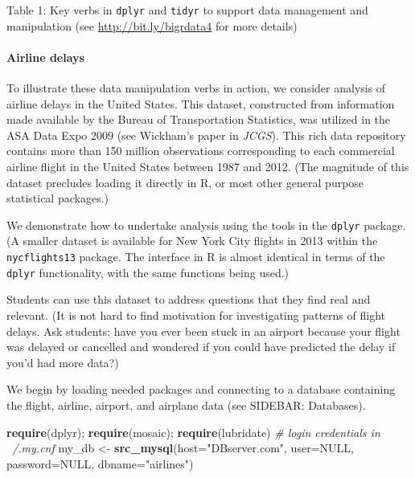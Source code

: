 \documentclass[]{article}
\newenvironment{Shaded}{\begin{snugshade}}{\end{snugshade}}
\newcommand{\KeywordTok}[1]{\textcolor[rgb]{0.13,0.29,0.53}{\textbf{{#1}}}}
\newcommand{\DataTypeTok}[1]{\textcolor[rgb]{0.13,0.29,0.53}{{#1}}}
\newcommand{\StringTok}[1]{\textcolor[rgb]{0.31,0.60,0.02}{{#1}}}
\newcommand{\CommentTok}[1]{\textcolor[rgb]{0.56,0.35,0.01}{\textit{{#1}}}}
\newcommand{\OtherTok}[1]{\textcolor[rgb]{0.56,0.35,0.01}{{#1}}}
\newcommand{\NormalTok}[1]{{#1}}
\begin{document}
Table 1: Key verbs in \texttt{dplyr} and \texttt{tidyr} to support data
management and manipulation (see \url{http://bit.ly/bigrdata4} for more
details)

\paragraph{Airline delays}\label{airline-delays}

To illustrate these data manipulation verbs in action, we consider
analysis of airline delays in the United States. This dataset,
constructed from information made available by the Bureau of
Transportation Statistics, was utilized in the ASA Data Expo 2009 (see
Wickham's paper in \emph{JCGS}). This rich data repository contains more
than 150 million observations corresponding to each commercial airline
flight in the United States between 1987 and 2012. (The magnitude of
this dataset precludes loading it directly in R, or most other general
purpose statistical packages.)

We demonstrate how to undertake analysis using the tools in the
\texttt{dplyr} package. (A smaller dataset is available for New York
City flights in 2013 within the \texttt{nycflights13} package. The
interface in R is almost identical in terms of the \texttt{dplyr}
functionality, with the same functions being used.)

Students can use this dataset to address questions that they find real
and relevant. (It is not hard to find motivation for investigating
patterns of flight delays. Ask students: have you ever been stuck in an
airport because your flight was delayed or cancelled and wondered if you
could have predicted the delay if you'd had more data?)

We begin by loading needed packages and connecting to a database
containing the flight, airline, airport, and airplane data (see SIDEBAR:
Databases).

\begin{Shaded}
\begin{Highlighting}[]
\KeywordTok{require}\NormalTok{(dplyr); }\KeywordTok{require}\NormalTok{(mosaic); }\KeywordTok{require}\NormalTok{(lubridate)    }\CommentTok{# login credentials in ~/.my.cnf}
\NormalTok{my_db <-}\StringTok{ }\KeywordTok{src_mysql}\NormalTok{(}\DataTypeTok{host=}\StringTok{"DBserver.com"}\NormalTok{, }\DataTypeTok{user=}\OtherTok{NULL}\NormalTok{, }\DataTypeTok{password=}\OtherTok{NULL}\NormalTok{, }\DataTypeTok{dbname=}\StringTok{"airlines"}\NormalTok{)}
\end{Highlighting}
\end{Shaded}
\end{document}

